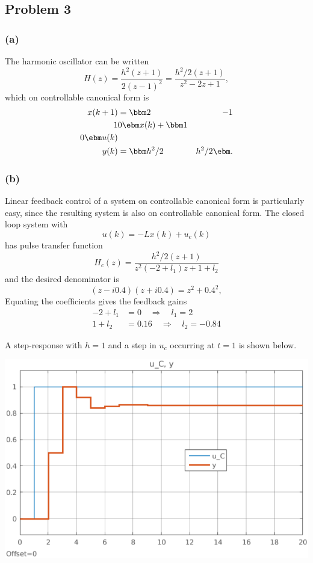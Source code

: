 \documentclass{scrartcl}
\begin{document}
\subsection*{Problem 3}
\label{sec:orgheadline16}

\subsubsection*{(a)}
\label{sec:orgheadline14}
The harmonic oscillator can be written
\[ H(z) = \frac{h^2(z+1)}{2(z-1)^2} = \frac{h^2/2(z+1)}{z^2-2z + 1}, \]
which  on controllable canonical form is 
   \begin{equation*}
 \begin{split}
  x(k+1) &= \bbm 2 & -1\\1 & 0 \ebm x(k) + \bbm 1\\0\ebm u(k)\\
  y(k) &= \bbm h^2/2 & h^2/2 \ebm .
 \end{split}
\end{equation*}

\subsubsection*{(b)}
\label{sec:orgheadline15}
Linear feedback control of a system on controllable canonical form is particularly easy, since the resulting system is also on controllable canonical form. The closed loop system with
\[ u(k) = -Lx(k) + u_c(k) \]
has pulse transfer function
\[ H_c(z) = \frac{h^2/2(z+1)}{z^2 (-2+l_1)z + 1+l_2} \]
and the desired denominator is
\[ (z-i0.4)(z+i0.4) = z^2 + 0.4^2, \]
Equating the coefficients gives the feedback gains
\begin{align*}
-2+l_1 &= 0 \quad \Rightarrow \quad l_1 = 2\\
1+l_2 &= 0.16 \quad \Rightarrow \quad l_2 = -0.84
\end{align*}

A step-response with \(h=1\) and a step in \(u_c\) occurring at \(t=1\) is shown below.
\begin{center}
\includegraphics[width=0.6\linewidth]{problem3_dummy_step_response-crop}
\end{center}
\end{document}
